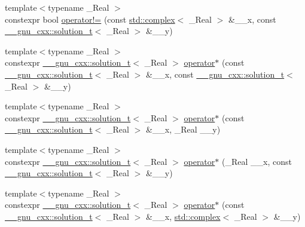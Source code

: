 \begin{DoxyCompactItemize}
\item 
{\footnotesize template$<$typename \+\_\+\+Real $>$ }\\constexpr bool \hyperlink{namespacestd_ad62f982d25741aa725c67cb3380782d9}{operator!=} (const \hyperlink{classstd_1_1complex}{std\+::complex}$<$ \+\_\+\+Real $>$ \&\+\_\+\+\_\+x, const \hyperlink{namespace____gnu__cxx_ae20ea642de50eb361074c62676b0159c}{\+\_\+\+\_\+gnu\+\_\+cxx\+::solution\+\_\+t}$<$ \+\_\+\+Real $>$ \&\+\_\+\+\_\+y)
\item 
{\footnotesize template$<$typename \+\_\+\+Real $>$ }\\constexpr \hyperlink{namespace____gnu__cxx_ae20ea642de50eb361074c62676b0159c}{\+\_\+\+\_\+gnu\+\_\+cxx\+::solution\+\_\+t}$<$ \+\_\+\+Real $>$ \hyperlink{namespacestd_afe761665ed44abc2edacac26cb45c645}{operator$\ast$} (const \hyperlink{namespace____gnu__cxx_ae20ea642de50eb361074c62676b0159c}{\+\_\+\+\_\+gnu\+\_\+cxx\+::solution\+\_\+t}$<$ \+\_\+\+Real $>$ \&\+\_\+\+\_\+x, const \hyperlink{namespace____gnu__cxx_ae20ea642de50eb361074c62676b0159c}{\+\_\+\+\_\+gnu\+\_\+cxx\+::solution\+\_\+t}$<$ \+\_\+\+Real $>$ \&\+\_\+\+\_\+y)
\item 
{\footnotesize template$<$typename \+\_\+\+Real $>$ }\\constexpr \hyperlink{namespace____gnu__cxx_ae20ea642de50eb361074c62676b0159c}{\+\_\+\+\_\+gnu\+\_\+cxx\+::solution\+\_\+t}$<$ \+\_\+\+Real $>$ \hyperlink{namespacestd_a13970e4b2bf6680ae3284c0f1117ea4d}{operator$\ast$} (const \hyperlink{namespace____gnu__cxx_ae20ea642de50eb361074c62676b0159c}{\+\_\+\+\_\+gnu\+\_\+cxx\+::solution\+\_\+t}$<$ \+\_\+\+Real $>$ \&\+\_\+\+\_\+x, \+\_\+\+Real \+\_\+\+\_\+y)
\item 
{\footnotesize template$<$typename \+\_\+\+Real $>$ }\\constexpr \hyperlink{namespace____gnu__cxx_ae20ea642de50eb361074c62676b0159c}{\+\_\+\+\_\+gnu\+\_\+cxx\+::solution\+\_\+t}$<$ \+\_\+\+Real $>$ \hyperlink{namespacestd_ab5d6a3adb4cf1cddc401e0465b832318}{operator$\ast$} (\+\_\+\+Real \+\_\+\+\_\+x, const \hyperlink{namespace____gnu__cxx_ae20ea642de50eb361074c62676b0159c}{\+\_\+\+\_\+gnu\+\_\+cxx\+::solution\+\_\+t}$<$ \+\_\+\+Real $>$ \&\+\_\+\+\_\+y)
\item 
{\footnotesize template$<$typename \+\_\+\+Real $>$ }\\constexpr \hyperlink{namespace____gnu__cxx_ae20ea642de50eb361074c62676b0159c}{\+\_\+\+\_\+gnu\+\_\+cxx\+::solution\+\_\+t}$<$ \+\_\+\+Real $>$ \hyperlink{namespacestd_acfa023cb6fb21c4285b73e1728cf340d}{operator$\ast$} (const \hyperlink{namespace____gnu__cxx_ae20ea642de50eb361074c62676b0159c}{\+\_\+\+\_\+gnu\+\_\+cxx\+::solution\+\_\+t}$<$ \+\_\+\+Real $>$ \&\+\_\+\+\_\+x, \hyperlink{classstd_1_1complex}{std\+::complex}$<$ \+\_\+\+Real $>$ \&\+\_\+\+\_\+y)

\end{DoxyCompactItemize}
